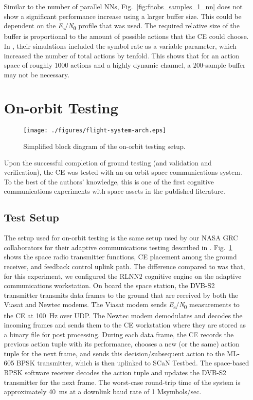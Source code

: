 \documentclass[journal]{IEEEtran}
\let\MYoriglatexcaption\caption
\renewcommand{\caption}[2][\relax]{\MYoriglatexcaption[#2]{#2}}
\begin{document}
Similar to the number of parallel NNs, Fig.~\ref{fig:fitobs_samples_1_nn} does not show a significant performance increase using a larger buffer size.  This could be dependent on the \textit{E}\textsubscript{s}/\textit{N}\textsubscript{0} profile that was used.  The required relative size of the buffer is proportional to the amount of possible actions that the CE could choose.  In \cite{paulo-jrnl}, their simulations included the symbol rate as a variable parameter, which increased the number of total actions by tenfold.  This shows that for an action space of roughly 1000 actions and a highly dynamic channel, a 200-sample buffer may not be necessary.

\section{On-orbit Testing} \label{sec:flight-testing}

\begin{figure}[b!]
	\centering
 	\texttt{[image: ./figures/flight-system-arch.eps]}
 	\caption{Simplified block diagram of the on-orbit testing setup.}
 	\label{fig:flight_test_setup}
\end{figure}

Upon the successful completion of ground testing (and validation and verification), the CE was tested with an on-orbit space communications system.  To the best of the authors' knowledge, this is one of the first cognitive communications experiments with space assets in the published literature.

\subsection{Test Setup} \label{sec:flight-testing-test-setup}
The setup used for on-orbit testing is the same setup used by our NASA GRC collaborators for their adaptive communications testing described in \cite{downey-paper}.  Fig.~\ref{fig:flight_test_setup} shows the space radio transmitter functions, CE placement among the ground receiver, and feedback control uplink path.  The difference compared to \cite{downey-paper} was that, for this experiment, we configured the RLNN2 cognitive engine on the adaptive communications workstation.  On board the space station, the DVB-S2 transmitter transmits data frames to the ground that are received by both the Viasat and Newtec modems.  The Viasat modem sends  \textit{E}\textsubscript{s}/\textit{N}\textsubscript{0} measurements to the CE at 100~Hz over UDP.  The Newtec modem demodulates and decodes the incoming frames and sends them to the CE workstation where they are stored as a binary file for post processing.  During each data frame, the CE records the previous action tuple with its performance, chooses a new (or the same) action tuple for the next frame, and sends this decision/subsequent action to the ML-605 BPSK transmitter, which is then uplinked to SCaN Testbed.  The space-based BPSK software receiver decodes the action tuple and updates the DVB-S2 transmitter for the next frame.  The worst-case round-trip time of the system is approximately 40~ms at a downlink baud rate of 1 Msymbols/sec.
\end{document}
